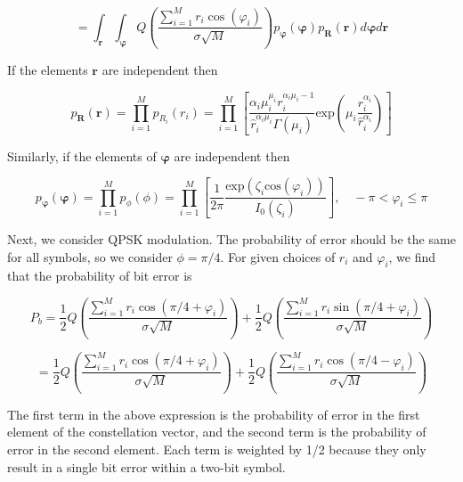 \documentclass[fleqn]{article}
\begin{document}
\begin{enumerate}
		\begin{equation*}
			= \int_{\mathbf{r}}{\int_{\boldsymbol{\varphi}}{Q\left(\frac{\sum_{i=1}^{M}{r_i\cos(\varphi_i)}}{\sigma\sqrt{M}}\right)p_{\boldsymbol{\varphi}}(\boldsymbol{\varphi})p_{\mathbf{R}}(\mathbf{r})d\boldsymbol{\varphi}}d\mathbf{r}}
		\end{equation*}
		
		If the elements $\mathbf{r}$ are independent then
		
		\begin{equation*}
			p_\mathbf{R}(\mathbf{r}) = \prod_{i=1}^{M}{p_{R_i}(r_i)} = \prod_{i=1}^{M}\left[\frac{\alpha_i\mu_i^{\mu_i}r_i^{\alpha_i\mu_i-1}}{\hat{r}_i^{\alpha_i\mu_i}\Gamma(\mu_i)}\text{exp}\left(\mu_i\frac{r_i^{\alpha_i}}{\hat{r}_i^{\alpha_i}}\right)\right]
		\end{equation*}
		
		Similarly, if the elements of $\boldsymbol{\varphi}$ are independent then
		
		\begin{equation*}
			p_{\boldsymbol{\varphi}}(\boldsymbol{\varphi}) = \prod_{i=1}^{M}{p_{\phi}(\phi)} = \prod_{i=1}^{M}\left[\frac{1}{2\pi}\frac{\text{exp}(\zeta_i\text{cos}(\varphi_i))}{I_0(\zeta_i)}\right], \quad -\pi < \varphi_i \leq \pi
		\end{equation*}
		
		Next, we consider QPSK modulation. The probability of error should be the same for all symbols, so we consider $\phi = \pi/4$. For given choices of $r_i$ and $\varphi_i$, we find that the probability of bit error is
		
		\begin{equation*}
			P_b = \frac{1}{2}Q\left(\frac{\sum_{i=1}^{M}{r_i\cos(\pi/4 + \varphi_i)}}{\sigma\sqrt{M}}\right) + \frac{1}{2}Q\left(\frac{\sum_{i=1}^{M}{r_i\sin(\pi/4 + \varphi_i)}}{\sigma\sqrt{M}}\right)
		\end{equation*}
		
		\begin{equation*}
			= \frac{1}{2}Q\left(\frac{\sum_{i=1}^{M}{r_i\cos(\pi/4 + \varphi_i)}}{\sigma\sqrt{M}}\right) + \frac{1}{2}Q\left(\frac{\sum_{i=1}^{M}{r_i\cos(\pi/4 - \varphi_i)}}{\sigma\sqrt{M}}\right)
		\end{equation*}
		
		The first term in the above expression is the probability of error in the first element of the constellation vector, and the second term is the probability of error in the second element. Each term is weighted by 1/2 because they only result in a single bit error within a two-bit symbol.
		 

\end{enumerate}
\end{document}
